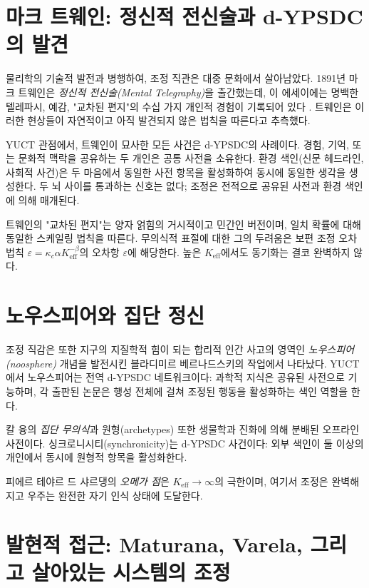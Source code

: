 \documentclass[12pt,a4paper]{article}
\begin{document}
	\section{마크 트웨인: 정신적 전신술과 d-YPSDC의 발견}
	
	물리학의 기술적 발전과 병행하여, 조정 직관은 대중 문화에서 살아남았다. 1891년 마크 트웨인은 \emph{정신적 전신술(Mental Telegraphy)}을 출간했는데, 이 에세이에는 명백한 텔레파시, 예감, "교차된 편지"의 수십 가지 개인적 경험이 기록되어 있다 \cite{Twain1891}. 트웨인은 이러한 현상들이 자연적이고 아직 발견되지 않은 법칙을 따른다고 추측했다.
	
	YUCT 관점에서, 트웨인이 묘사한 모든 사건은 d-YPSDC의 사례이다. 경험, 기억, 또는 문화적 맥락을 공유하는 두 개인은 공통 사전을 소유한다. 환경 색인(신문 헤드라인, 사회적 사건)은 두 마음에서 동일한 사전 항목을 활성화하여 동시에 동일한 생각을 생성한다. 두 뇌 사이를 통과하는 신호는 없다; 조정은 전적으로 공유된 사전과 환경 색인에 의해 매개된다.
	
	트웨인의 "교차된 편지"는 양자 얽힘의 거시적이고 민간인 버전이며, 일치 확률에 대해 동일한 스케일링 법칙을 따른다. 무의식적 표절에 대한 그의 두려움은 보편 조정 오차 법칙 \(\varepsilon = \kappa_c \alpha K_{\mathrm{eff}}^{-\beta}\)의 오차항 \(\varepsilon\)에 해당한다. 높은 \(K_{\mathrm{eff}}\)에서도 동기화는 결코 완벽하지 않다.
	
	\section{노우스피어와 집단 정신}
	
	조정 직감은 또한 지구의 지질학적 힘이 되는 합리적 인간 사고의 영역인 \emph{노우스피어(noosphere)} 개념을 발전시킨 블라디미르 베르나드스키의 작업에서 나타났다. YUCT에서 노우스피어는 전역 d-YPSDC 네트워크이다: 과학적 지식은 공유된 사전으로 기능하며, 각 출판된 논문은 행성 전체에 걸쳐 조정된 행동을 활성화하는 색인 역할을 한다.
	
	칼 융의 \emph{집단 무의식}과 원형(archetypes) 또한 생물학과 진화에 의해 분배된 오프라인 사전이다. 싱크로니시티(synchronicity)는 d-YPSDC 사건이다: 외부 색인이 둘 이상의 개인에서 동시에 원형적 항목을 활성화한다.
	
	피에르 테야르 드 샤르댕의 \emph{오메가 점}은 \(K_{\mathrm{eff}} \to \infty\)의 극한이며, 여기서 조정은 완벽해지고 우주는 완전한 자기 인식 상태에 도달한다.
	
	\section{발현적 접근: Maturana, Varela, 그리고 살아있는 시스템의 조정}
	
\end{document}

